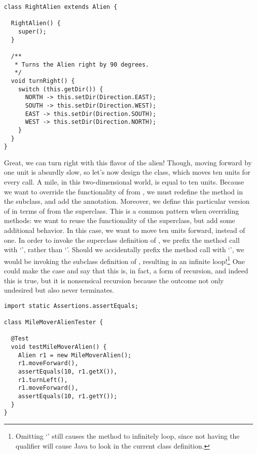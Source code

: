 \begin{lstlisting}[language=MyJava]
class RightAlien extends Alien {

  RightAlien() { 
    super(); 
  }

  /**
   * Turns the Alien right by 90 degrees.
   */
  void turnRight() {
    switch (this.getDir()) {
      NORTH -> this.setDir(Direction.EAST);
      SOUTH -> this.setDir(Direction.WEST);
      EAST -> this.setDir(Direction.SOUTH);
      WEST -> this.setDir(Direction.NORTH);
    }
  }
}
\end{lstlisting}

Great, we can turn right with this flavor of the alien! Though, moving forward by one unit is absurdly slow, so let's now design the  class, which moves ten units for every  call. A mile, in this two-dimensional world, is equal to ten units. Because we want to override the functionality of  from , we must redefine the method in the subclass, and add the  annotation. Moreover, we define this particular version of  in terms of  from the superclass. This is a common pattern when overriding methods: we want to reuse the functionality of the superclass, but add some additional behavior. In this case, we want to move ten units forward, instead of one. In order to invoke the superclass definition of , we prefix the method call with `', rather than `'. Should we accidentally prefix the method call with `', we would be invoking the subclass definition of , resulting in an infinite loop!\footnote{Omitting `' still causes the method to infinitely loop, since not having the qualifier will cause Java to look in the current class definition.} One could make the case and say that this is, in fact, a form of recursion, and indeed this is true, but it is nonsensical recursion because the outcome not only undesired but also never terminates.

\begin{lstlisting}[language=MyJava]
import static Assertions.assertEquals;

class MileMoverAlienTester {

  @Test
  void testMileMoverAlien() {
    Alien r1 = new MileMoverAlien();
    r1.moveForward(),
    assertEquals(10, r1.getX()),
    r1.turnLeft(),
    r1.moveForward(),
    assertEquals(10, r1.getY());
  }
}
\end{lstlisting}


